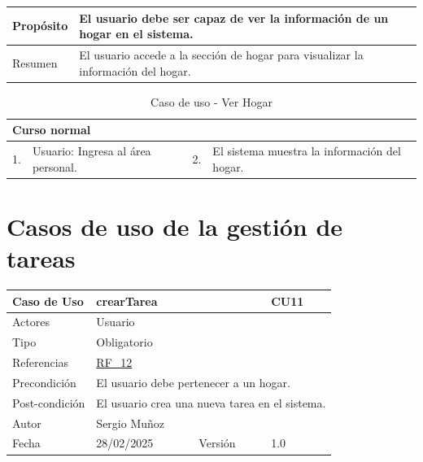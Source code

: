 \begin{table}[H]
    \centering
    \begin{tabular}{| m{} | m{} | m{} | m{} |}
        \hline
        Propósito & \multicolumn{3}{m{0.67\textwidth}|}{El usuario debe ser capaz de ver la información de un hogar en el sistema.} \\ 
        \hline
        Resumen & \multicolumn{3}{m{0.67\textwidth}|}{El usuario accede a la sección de hogar para visualizar la información del hogar.} \\ 
        \hline
    \end{tabular}
\end{table}

\begin{table}[H]
    \centering
    \begin{tabular}{| m{} | m{} | m{} | m{} |}
        \hline
        \multicolumn{4}{|m{0.9\textwidth}|}{Curso normal} \\ 
        \hline
        1. & Usuario: Ingresa al área personal. 
        & 2. & El sistema muestra la información del hogar. \\ 
        \hline
    \end{tabular}
    \caption{Caso de uso - Ver Hogar}
\end{table}

\clearpage

\section{Casos de uso de la gestión de tareas}

\begin{table}[H]
    \centering
    \begin{tabular}{| m{} | m{} | m{} | m{} |}
        \hline
        \rowcolor[HTML]{C0C0C0} Caso de Uso & \multicolumn{2}{|m{0.43\textwidth}|}{crearTarea} &  CU11\\ 
        \hline
        Actores & \multicolumn{3}{l|}{Usuario} \\ 
        \hline
        Tipo & \multicolumn{3}{l|}{Obligatorio} \\ 
        \hline
        Referencias & \multicolumn{3}{l|}{\hyperref[req:RF12]{RF\_12}} \\ 
        \hline
        Precondición & \multicolumn{3}{m{0.67\textwidth}|}{El usuario debe pertenecer a un hogar.} \\ 
        \hline
        Post-condición & \multicolumn{3}{m{0.67\textwidth}|}{El usuario crea una nueva tarea en el sistema.} \\ 
        \hline
        Autor & \multicolumn{3}{l|}{Sergio Muñoz} \\ 
        \hline
        Fecha & 28/02/2025 & Versión & 1.0 \\ 
        \hline
    \end{tabular}
\end{table}

